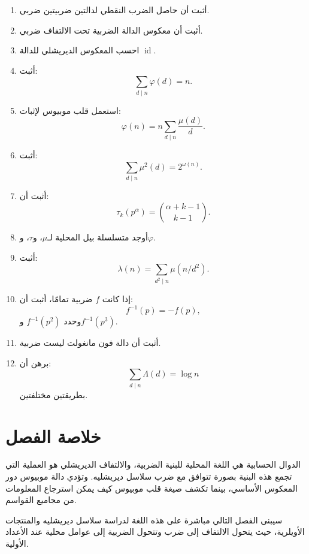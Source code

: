 \begin{enumerate}
  \item أثبت أن حاصل الضرب النقطي لدالتين ضربيتين ضربي.
  \item أثبت أن معكوس الدالة الضربية تحت الالتفاف ضربي.
  \item احسب المعكوس الديريشلي للدالة \(\operatorname{id}\).
  \item أثبت:
  \[
  \sum_{d\mid n}\varphi(d)=n.
  \]
  \item استعمل قلب موبيوس لإثبات:
  \[
  \varphi(n)=n\sum_{d\mid n}\frac{\mu(d)}d.
  \]
  \item أثبت:
  \[
  \sum_{d\mid n}\mu^2(d)=2^{\omega(n)}.
  \]
  \item أثبت أن:
  \[
  \tau_k(p^\alpha)
  =
  \binom{\alpha+k-1}{k-1}.
  \]
  \item أوجد متسلسلة بيل المحلية لـ\(\mu\)، و\(\tau\)، و\(\varphi\).
  \item أثبت:
  \[
  \lambda(n)
  =
  \sum_{d^2\mid n}\mu(n/d^2).
  \]
  \item إذا كانت \(f\) ضربية تمامًا، أثبت أن:
  \[
  f^{-1}(p)=-f(p),
  \]
  وحدد \(f^{-1}(p^2)\) و\(f^{-1}(p^3)\).
  \item أثبت أن دالة فون مانغولت ليست ضربية.
  \item برهن أن:
  \[
  \sum_{d\mid n}\Lambda(d)=\log n
  \]
  بطريقتين مختلفتين.
\end{enumerate}

\section{خلاصة الفصل}

الدوال الحسابية هي اللغة المحلية للبنية الضربية، والالتفاف الديريشلي هو العملية التي تجمع هذه البنية بصورة تتوافق مع ضرب سلاسل ديريشليه. وتؤدي دالة موبيوس دور المعكوس الأساسي، بينما تكشف صيغة قلب موبيوس كيف يمكن استرجاع المعلومات من مجاميع القواسم.

سيبنى الفصل التالي مباشرة على هذه اللغة لدراسة سلاسل ديريشليه والمنتجات الأويلرية، حيث يتحول الالتفاف إلى ضرب وتتحول الضربية إلى عوامل محلية عند الأعداد الأولية.
